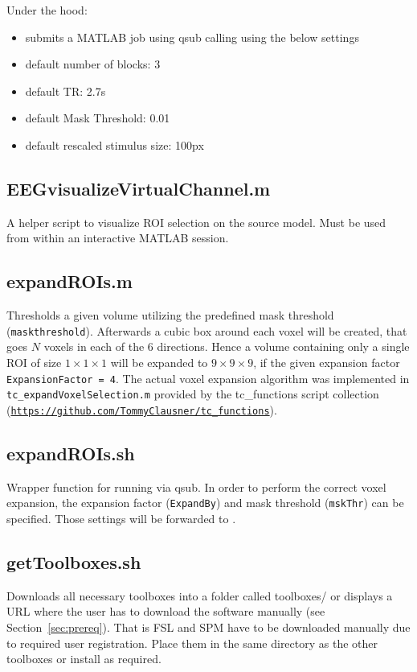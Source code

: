 \documentclass[12pt,a4paper]{scrartcl}
\begin{document}
\noindent Under the hood:
\begin{itemize}
\item submits a MATLAB job using qsub calling \texttt{} using the below settings
\item default number of blocks: 3
\item default TR: 2.7s
\item default Mask Threshold: 0.01
\item default rescaled stimulus size: 100px
\end{itemize}

\subsection{EEGvisualizeVirtualChannel.m}
\label{m:visVirtChan}
A helper script to visualize ROI selection on the source model. Must be used from within an interactive MATLAB session.

\subsection{expandROIs.m}
\label{m:expROI}
Thresholds a given volume utilizing the predefined mask threshold (\texttt{maskthreshold}). Afterwards a cubic box around each voxel will be created, that goes $N$ voxels in each of the 6 directions. Hence a volume containing only a single ROI of size $1\times1\times1$ will be expanded to $9\times9\times9$, if the given expansion factor \texttt{ExpansionFactor = 4}. The actual voxel expansion algorithm was implemented in \texttt{tc\_expandVoxelSelection.m} provided by the tc\_functions script collection (\href{https://github.com/TommyClausner/tc\_functions}{\nolinkurl{https://github.com/TommyClausner/tc\_functions}}).\\

\subsection{expandROIs.sh}
\label{sh:expROI}
Wrapper function for running \texttt{} via qsub. In order to perform the correct voxel expansion, the expansion factor (\texttt{ExpandBy}) and mask threshold (\texttt{mskThr}) can be specified. Those settings will be forwarded to \texttt{}.\\

\subsection{getToolboxes.sh}
\label{sh:getTools}
Downloads all necessary toolboxes into a folder called toolboxes/ or displays a URL where the user has to download the software manually (see Section~\ref{sec:prereq}). That is FSL and SPM have to be downloaded manually due to required user registration. Place them in the same directory as the other toolboxes or install as required.\\
\end{document}
